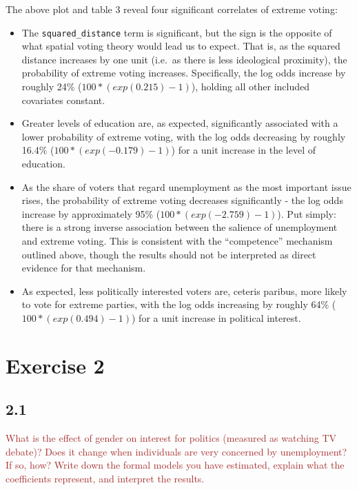 \documentclass[
]{article}
\begin{document}
The above plot and table 3 reveal four significant correlates of extreme
voting:

\begin{itemize}
\item
  The \texttt{squared\_distance} term is significant, but the sign is
  the opposite of what spatial voting theory would lead us to expect.
  That is, as the squared distance increases by one unit (i.e.~as there
  is less ideological proximity), the probability of extreme voting
  increases. Specifically, the log odds increase by roughly 24\%
  (\(100*(exp(0.215)-1)\)), holding all other included covariates
  constant.
\item
  Greater levels of education are, as expected, significantly associated
  with a lower probability of extreme voting, with the log odds
  decreasing by roughly 16.4\% (\(100*(exp(-0.179)-1)\)) for a unit
  increase in the level of education.
\item
  As the share of voters that regard unemployment as the most important
  issue rises, the probability of extreme voting decreases significantly
  - the log odds increase by approximately 95\%
  (\(100*(exp(-2.759)-1)\)). Put simply: there is a strong inverse
  association between the salience of unemployment and extreme voting.
  This is consistent with the ``competence'' mechanism outlined above,
  though the results should not be interpreted as direct evidence for
  that mechanism.
\item
  As expected, less politically interested voters are, ceteris paribus,
  more likely to vote for extreme parties, with the log odds increasing
  by roughly 64\% (\(100*(exp(0.494)-1)\)) for a unit increase in
  political interest.
\end{itemize}

\hypertarget{exercise-2}{%
\section{Exercise 2}\label{exercise-2}}

\hypertarget{section-3}{%
\subsection{2.1}\label{section-3}}

\textcolor{brown}{What is the effect of gender on interest for politics (measured as watching TV debate)? Does it change when individuals are very concerned by unemployment? If so, how? Write down the formal models you have estimated, explain what the coefficients represent, and interpret the results.}
\end{document}
